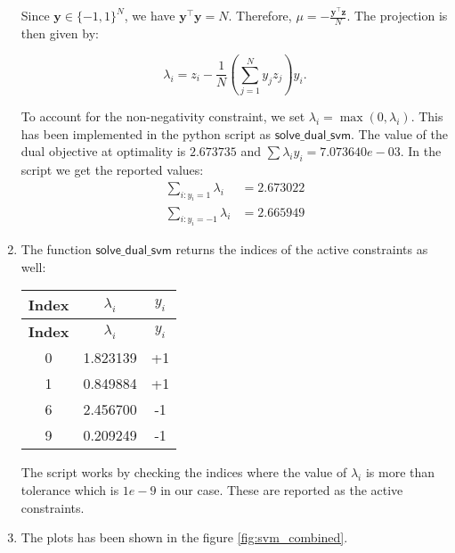 \documentclass[12pt,a4paper]{article}
\theoremstyle{remark}
\begin{document}
\begin{enumerate}
Since \(\mathbf{y} \in \{-1, 1\}^N\), we have \(\mathbf{y}^\top \mathbf{y} = N\). Therefore, \(\mu = -\frac{\mathbf{y}^\top \mathbf{z}}{N}\). The projection is then given by:

\[
\lambda_i = z_i - \frac{1}{N} \left( \sum_{j=1}^N y_j z_j \right) y_i.
\]

To account for the non-negativity constraint, we set \(\lambda_i = \max(0, \lambda_i)\). This has been implemented in the python script as $\mathsf{solve\_dual\_svm}$. The value of the dual objective at optimality is $2.673735$ and $\sum \lambda_i y_i = 7.073640e-03$. In the script we get the reported values:
\begin{align*}
    \sum_{i: y_i = 1} \lambda_i &= 2.673022\\
    \sum_{i: y_i = -1} \lambda_i &= 2.665949
\end{align*}

\item The function $\mathsf{solve\_dual\_svm}$ returns the indices of the active constraints as well:

\begin{longtable}{|c|c|c|}
    \hline
    \textbf{Index} & \textbf{\( \lambda_i \)} & \textbf{\( y_i \)} \\
    \hline
    \endfirsthead
    \hline
    \textbf{Index} & \textbf{\( \lambda_i \)} & \textbf{\( y_i \)} \\
    \hline
    \endhead
    0 & 1.823139 & +1 \\
    1 & 0.849884 & +1 \\
    6 & 2.456700 & -1 \\
    9 & 0.209249 & -1 \\
    \hline
\end{longtable}

The script works by checking the indices where the value of $\lambda_i$ is more than tolerance which is $1e-9$ in our case. These are reported as the active constraints.

\item The plots has been shown in the figure \ref{fig:svm_combined}.


\end{enumerate}
\end{document}

